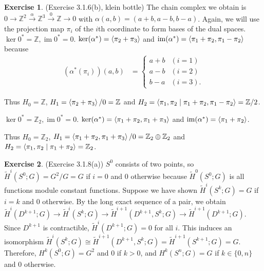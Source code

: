\documentclass[12pt, psamsfonts]{amsart}
\theoremstyle{definition}
\newtheorem*{exer}{Exercise}
\theoremstyle{remark}
\DeclareMathOperator{\im}{im}
\numberwithin{equation}{section}
\begin{document}
\begin{exer}{(Exercise 3.1.6(b), klein bottle)}
  The chain complex we obtain is $0 \rightarrow \mathbb{Z}^2 \xrightarrow{\alpha} \mathbb{Z}^3 \xrightarrow{0} \mathbb{Z} \rightarrow 0$ with $\alpha(a, b) = (a + b, a - b, b - a)$.
  Again, we will use the projection map $\pi_i$ of the $i$th coordinate to form bases of the dual spaces.
  $\ker 0^{\ast} = \mathbb{Z}, \im 0^{\ast} = 0$.
  $\ker(\alpha^{\ast}) = \ev{\pi_2 + \pi_3}$ and $\im(\alpha^{\ast}) = \ev{\pi_1 + \pi_2, \pi_1 - \pi_2}$ because
  \begin{align*}
    (\alpha^{\ast}(\pi_i))(a, b) &= \begin{cases}
      a + b & (i = 1) \\
      a - b & (i = 2) \\
      b - a & (i = 3).
    \end{cases}
  \end{align*}

  Thus $H_0 = \mathbb{Z}$, $H_1 = \ev{\pi_2 + \pi_3} / 0 = \mathbb{Z}$ and $H_2 = \ev{\pi_1, \pi_2 \mid \pi_1 + \pi_2, \pi_1 - \pi_2} = \mathbb{Z} / 2$.

  $\ker 0^{\ast} = \mathbb{Z}_2, \im 0^{\ast} = 0$.
  $\ker(\alpha^{\ast}) = \ev{\pi_1 + \pi_2, \pi_1 + \pi_3}$ and $\im(\alpha^{\ast}) = \ev{\pi_1 + \pi_2}$.

  Thus $H_0 = \mathbb{Z}_2$, $H_1 = \ev{\pi_1 + \pi_2, \pi_1 + \pi_3} / 0 = \mathbb{Z}_2 \oplus \mathbb{Z}_2$ and $H_2 = \ev{\pi_1, \pi_2 \mid \pi_1 + \pi_2} = \mathbb{Z}_2$.
\end{exer}

\begin{exer}{(Exercise 3.1.8(a))}
  $S^0$ consists of two points, so $\tilde{H}^i(S^0; G) = G^2 / G = G$ if $i = 0$ and 0 otherwise because $\tilde{H}^0(S^0; G)$ is all functions module constant functions.
  Suppose we have shown $\tilde{H}^i(S^k; G) = G$ if $i = k$ and 0 otherwise.
  By the long exact sequence of a pair, we obtain $\tilde{H}^i(D^{k + 1}; G) \rightarrow \tilde{H}^i(S^k; G) \rightarrow \tilde{H}^{i + 1}(D^{k + 1}, S^k; G) \rightarrow \tilde{H}^{i + 1}(D^{k + 1}; G)$.
  Since $D^{k + 1}$ is contractible, $\tilde{H}^i(D^{k + 1}; G) = 0$ for all $i$.
  This induces an isomorphism $\tilde{H}^i(S^k; G) \cong \tilde{H}^{i + 1}(D^{k + 1}, S^k; G) = \tilde{H}^{i + 1}(S^{k + 1}; G) = G$.
  Therefore, $H^k(S^0; G) = G^2$ and 0 if $k > 0$, and $H^k(S^n; G) = G$ if $k \in \{ 0, n \}$ and 0 otherwise.
\end{exer}
\end{document}
